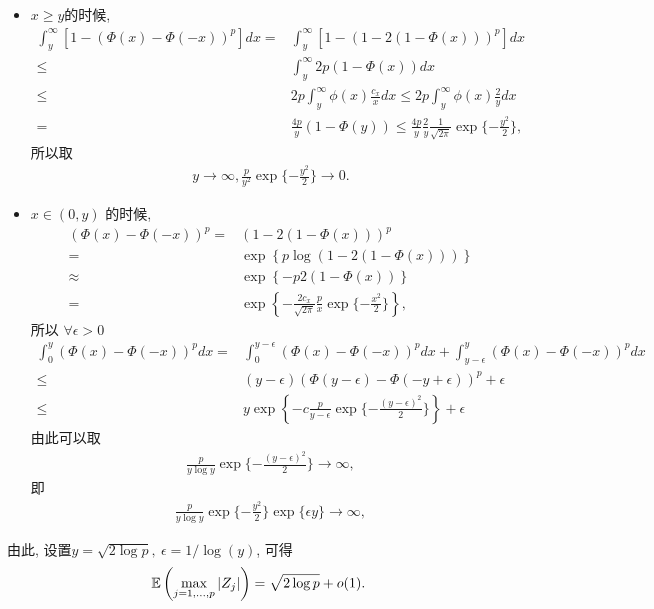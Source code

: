 \begin{itemize}
	\item $x\geq y$的时候,
\begin{align*}
	\int_y^\infty \left[ 1-(\Phi(x)-\Phi(-x))^p\right]dx =& \int_y^\infty \left[ 1-\left(1-2(1-\Phi(x))   \right)^p \right]dx  \\
	\leq & \int_y^\infty 2p(1-\Phi(x))  dx  \\
	\leq & 2p \int_y^\infty \phi(x)\frac{c_x}{x} dx \leq 2p \int_y^\infty \phi(x)\frac{2}{y} dx \\
=& \frac{4p}{y} (1-\Phi(y))\leq \frac{4p}{y} \frac{2}{y} \frac{1}{\sqrt{2\pi}} \exp\{-\frac{y^2}{2}\}, 
\end{align*}
所以取
\begin{align*}
	y \to \infty  , \frac{p}{y^2}\exp\{-\frac{y^2}{2}\} \to 0.
\end{align*}
\item $x \in (0,y)$ 的时候,
\begin{align*}
	(\Phi(x)-\Phi(-x))^p=&\left(1-2(1-\Phi(x))   \right)^p\\
	=&\exp\left\{p \log\left(1-2(1-\Phi(x))   \right) \right\}\\
	\approx &\exp\left\{-p 2\left(1-\Phi(x)   \right) \right\}\\
	=& \exp\left\{-\frac{2 c_{x}}{\sqrt{2\pi}} \frac{p}{x}\exp\{-\frac{x^2}{2}\} \right\},
	\end{align*}	
 所以 $\forall \epsilon>0$ 
 \begin{align*}
	\int_0^y(\Phi(x)-\Phi(-x))^p dx=&\int_0^{y-\epsilon} (\Phi(x)-\Phi(-x))^p dx+ \int_{y-\epsilon}^y (\Phi(x)-\Phi(-x))^p dx\\
	\leq & (y-\epsilon) (\Phi(y-\epsilon)-\Phi(-y+\epsilon))^p +\epsilon\\
	\leq & y \exp\left\{-c \frac{p}{y-\epsilon}\exp\{-\frac{(y-\epsilon)^2}{2}\} \right\} +\epsilon
 \end{align*}	
 由此可以取
 \begin{align*}
	\frac{p}{y \log y} \exp\{-\frac{(y-\epsilon)^2}{2}\} \to \infty,
 \end{align*}
 即
 \begin{align*}
	\frac{p}{y \log y} \exp\{-\frac{y^2}{2}\} \exp\{\epsilon y\}  \to \infty,
 \end{align*}
\end{itemize}
由此, 设置$y=\sqrt{2 \log p},~\epsilon=1/\log(y)$, 可得
\begin{align*}
	\mathbb{E} \left( \max_{j=1,\ldots,p} |Z_j| \right)=\sqrt{2 \log p}+o(1).
\end{align*}	